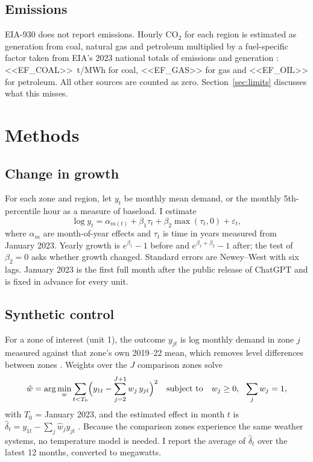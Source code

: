 \documentclass[11pt,a4paper]{article}
\begin{document}
\subsection{Emissions}
EIA-930 does not report emissions. Hourly CO$_2$ for each region is estimated as generation from coal, natural gas and petroleum multiplied by a fuel-specific factor taken from EIA's 2023 national totals of emissions and generation \cite{eiafaq}: <<EF_COAL>>~t/MWh for coal, <<EF_GAS>> for gas and <<EF_OIL>> for petroleum. All other sources are counted as zero. Section~\ref{sec:limits} discusses what this misses.

\section{Methods}

\subsection{Change in growth}\label{sec:m-growth}
For each zone and region, let $y_t$ be monthly mean demand, or the monthly 5th-percentile hour as a measure of baseload. I estimate
\begin{equation}
\log y_t = \alpha_{m(t)} + \beta_1 \tau_t + \beta_2 \max(\tau_t, 0) + \varepsilon_t ,
\label{eq:growth}
\end{equation}
where $\alpha_m$ are month-of-year effects and $\tau_t$ is time in years measured from January 2023. Yearly growth is $e^{\beta_1}-1$ before and $e^{\beta_1+\beta_2}-1$ after; the test of $\beta_2 = 0$ asks whether growth changed. Standard errors are Newey--West \cite{neweywest} with six lags. January 2023 is the first full month after the public release of ChatGPT and is fixed in advance for every unit.

\subsection{Synthetic control}\label{sec:m-scm}
For a zone of interest (unit 1), the outcome $y_{jt}$ is log monthly demand in zone $j$ measured against that zone's own 2019--22 mean, which removes level differences between zones \cite{doudchenko}. Weights over the $J$ comparison zones solve
\begin{equation}
\hat{w} = \arg\min_{w} \sum_{t < T_0} \Bigl( y_{1t} - \sum_{j=2}^{J+1} w_j\, y_{jt} \Bigr)^{2}
\quad \text{subject to} \quad w_j \ge 0,\ \ \sum_j w_j = 1 ,
\label{eq:scm}
\end{equation}
with $T_0$ = January 2023, and the estimated effect in month $t$ is $\hat{\delta}_t = y_{1t} - \sum_j \hat{w}_j y_{jt}$ \cite{adh2010,abadie2021}. Because the comparison zones experience the same weather systems, no temperature model is needed. I report the average of $\hat\delta_t$ over the latest 12 months, converted to megawatts.
\end{document}
